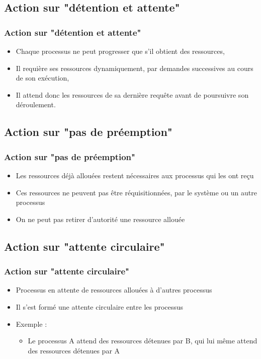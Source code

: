 \subsection{Action sur "détention et attente"}
\begin{frame}
\frametitle{Action sur "détention et attente"}
\begin{itemize}
\item Chaque processus ne peut progresser que s’il obtient des ressources,
\item Il requière ses ressources dynamiquement, par demandes successives au cours de son exécution,
\item Il attend donc les ressources de sa dernière requête avant de poursuivre son déroulement.
\end{itemize}
\end{frame}

\subsection{Action sur "pas de préemption"}

\begin{frame}
\frametitle{Action sur "pas de préemption"}
\begin{itemize}
\item Les ressources déjà allouées restent nécessaires aux processus qui les ont reçu
\item Ces ressources ne peuvent pas être réquisitionnées, par le système ou un autre processus
\item On ne peut pas retirer d'autorité une ressource allouée
\end{itemize}
\end{frame}

\subsection{Action sur "attente circulaire"}

\begin{frame}
\frametitle{Action sur "attente circulaire"}
\begin{itemize}
\item Processus en attente de ressources allouées à d’autres processus
\item Il s’est formé une attente circulaire entre les processus
\item Exemple :
\begin{itemize}
\item Le processus A attend des ressources détenues par B, qui lui même attend des ressources détenues par A
\end{itemize}
\end{itemize}
\end{frame}

